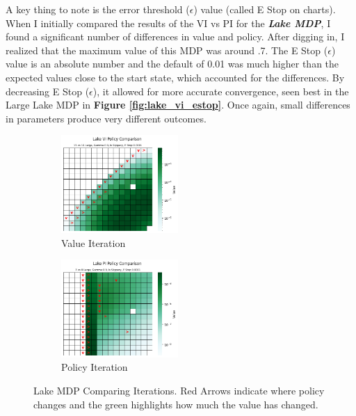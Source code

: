 \documentclass[letterpaper]{article} %
\begin{document}
A key thing to note is the error threshold ($\epsilon$) value (called E Stop on charts).  When I initially compared the results of the VI vs PI for the \textbf{\emph{Lake MDP}}, I found a significant number of differences in value and policy.  After digging in, I realized that the maximum value of this MDP was around .7.  The E Stop ($\epsilon$) value is an absolute number and the default of 0.01 was much higher than the expected values close to the start state, which accounted for the differences.  By decreasing E Stop ($\epsilon$), it allowed for more accurate convergence, seen best in the Large Lake MDP in \textbf{Figure \ref{fig:lake_vi_estop}}.  Once again, small differences in parameters produce very different outcomes.  

\begin{figure}[!htb]
	\begin{subfigure}[b]{0.25\textwidth}
	\centering
		\includegraphics[width=1.75in]{Figures/Lake_VI_Policy_Comparison_15_vs_16_Large__Gamma_0_9__Is_Slippery__E_Stop_0_0001.png}
		\caption{Value Iteration}
  	\end{subfigure}%
	\begin{subfigure}[b]{0.25\textwidth}
	\centering
		\includegraphics[width=1.75in]{Figures/Lake_PI_Policy_Comparison_7_vs_8_Large__Gamma_0_9__Is_Slippery__E_Stop_0_0001.png}
		\caption{Policy Iteration}
  	\end{subfigure}%
\caption{Lake MDP Comparing Iterations.  Red Arrows indicate where policy changes and the green highlights how much the value has changed.}
\label{fig:lake_iteration_comparison}
\end{figure}
\end{document}
